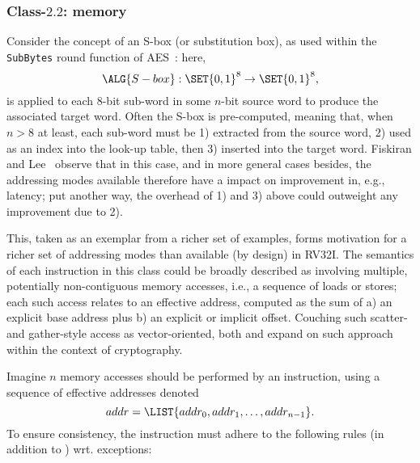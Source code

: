 


\subsubsection{Class-$2.2$: memory}
\label{sec:spec:instruction:2:2}

Consider the concept of an S-box (or substitution box), as used within the
{\tt SubBytes} round function of 
AES~\cite[Section 5.1.1]{SCARV:FIPS:197}:
here, 
\[
\ALG{S-box} : \SET{ 0, 1 }^{8} \rightarrow \SET{ 0, 1 }^{8} ,
\]
is applied to each $8$-bit sub-word in some $n$-bit source word to produce
the associated target word.  Often the S-box is pre-computed, meaning that, 
when $n > 8$ at least, each sub-word must be
1) extracted from the source word,
2) used as an index into the look-up table,
   then
3)  inserted into the target word.
Fiskiran and Lee~\cite{SCARV:FisLee:01} observe that in this case, and in
more general cases besides, the addressing modes available therefore have
a impact on improvement in, e.g., latency; put another way, the overhead 
of 1) and 3) above could outweight any improvement due to 2).

This, taken as an exemplar from a richer set of examples, forms motivation
for a richer set of addressing modes than available (by design) in RV32I.
The semantics of each instruction in this class could be broadly described 
as involving multiple, potentially non-contiguous memory accesses, i.e., a 
sequence of loads or stores; each such access relates to an effective
address, computed as the sum of 
a) an explicit             base address 
   plus
b) an explicit or implicit offset.
Couching such scatter- and gather-style access as vector-oriented, both
\cite[Section 3.1]{SCARV:FouMoo:05} 
and 
\cite[Section 3.3]{SCARV:Fournier:07}
expand on such approach within the context of cryptography.

Imagine $n$ memory accesses should be performed by an instruction, using a 
sequence of effective addresses denoted
\[
addr = \LIST{ addr_0, addr_1, \ldots, addr_{n-1} } .
\]
To ensure consistency, the instruction must adhere to the following rules 
(in addition to ) wrt. exceptions:

